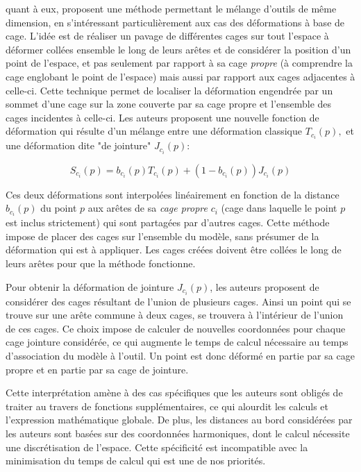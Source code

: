 \cite{GPCP13} quant à eux, proposent une méthode permettant le mélange
d'outils de même dimension, en s'intéressant particulièrement aux cas des
déformations à base de cage. L'idée est de réaliser un pavage de différentes
cages sur tout l'espace à déformer  collées ensemble le long de leurs arêtes
et de considérer la position d'un point de l'espace, et pas seulement par
rapport à sa cage \textit{propre} (à comprendre la cage englobant le point de
l'espace) mais aussi par rapport aux cages adjacentes à celle-ci. Cette
technique permet de localiser la déformation engendrée par un sommet d'une
cage sur la zone couverte par sa cage propre et l'ensemble des cages
incidentes à celle-ci. Les auteurs proposent une nouvelle fonction de
déformation qui résulte d'un mélange entre une déformation classique
$T_{c_i}(p),$ et une déformation dite "de jointure" $J_{c_i}(p)$:

\begin{equation}
  S_{c_i}(p) = b_{c_i}(p) T_{c_i}(p) + (1-b_{c_i}(p)) J_{c_i}(p)
\end{equation}

Ces deux déformations sont interpolées linéairement en fonction de la distance
$b_{c_i}(p)$ du point $p$ aux arêtes de sa \textit{cage propre} $c_i$ (cage
dans laquelle le point $p$ est inclus strictement) qui sont partagées par
d'autres cages. Cette méthode impose de placer des cages sur l'ensemble du
modèle, sans présumer de la déformation qui est à appliquer. Les cages créées
doivent être collées le long de leurs arêtes pour que la méthode fonctionne.

Pour obtenir la déformation de jointure $J_{c_i}(p)$, les auteurs proposent de
considérer des cages résultant de l'union de plusieurs cages. Ainsi un point
qui se trouve sur une arête commune à deux cages, se trouvera à l'intérieur de
l'union de ces cages. Ce choix impose de calculer de nouvelles coordonnées
pour chaque cage jointure considérée, ce qui augmente le temps de calcul
nécessaire au temps d'association du modèle à l'outil. Un point est donc
déformé en partie par sa cage propre et en partie par sa cage de jointure.

Cette interprétation amène à des cas spécifiques que les auteurs sont obligés
de traiter au travers de fonctions supplémentaires, ce qui alourdit les
calculs et l'expression mathématique globale. De plus, les distances au bord
considérées par les auteurs sont basées sur des coordonnées harmoniques, dont
le calcul nécessite une discrétisation de l'espace. Cette spécificité est
incompatible avec la minimisation du temps de calcul qui est une de nos
priorités.

